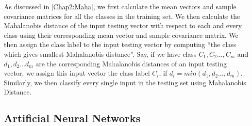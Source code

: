 %    
%   
%    
%   
    
    As discussed in \ref{Chap2:Maha}, we first calculate the mean vectors and sample covariance matrices for all the classes in the training set. We then calculate the Mahalanobis distance of the input testing vector with respect to each and every class using their corresponding mean vector and sample covariance matrix. We then assign the class label to the input testing vector by computing ``the class which gives smallest Mahalanobis distance''. Say, if we have class $C_1, C_2 \ldots , C_m$ and $d_1, d_2 \ldots d_m$ are the corresponding Mahalanobis distances of an input testing vector, we assign this input vector the class label $C_i$, if $d_i = min(d_1, d_2 \ldots , d_m)$. Similarly, we then classify every single input in the testing set using Mahalanobis Distance.  
    
\subsection{Artificial Neural Networks}
\label{Artificial Neural Networks}
 

